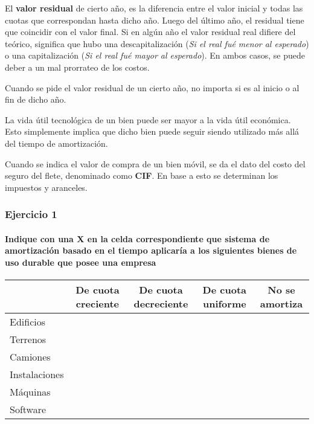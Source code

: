 \documentclass[12pt,a4paper]{article}
\newcommand{\consigna}[1]{\paragraph{\indent #1} \hspace{0pt}}
\begin{document}
{            El \textbf{valor residual} de cierto año, es la diferencia entre el valor inicial y todas las cuotas que correspondan hasta dicho año.
            Luego del último año, el residual tiene que coincidir con el valor final.
            Si en algún año el valor residual real difiere del teórico, significa que hubo una descapitalización (\textsl{Si el real fué menor al esperado}) o una capitalización (\textsl{Si el real fué mayor al esperado}).
            En ambos casos, se puede deber a un mal prorrateo de los costos.
            
            Cuando se pide el valor residual de un cierto año, no importa si es al inicio o al fin de dicho año.
            
            La vida útil tecnológica de un bien puede ser mayor a la vida útil económica.
            Esto simplemente implica que dicho bien puede seguir siendo utilizado más allá del tiempo de amortización.
            
            Cuando se indica el valor de compra de un bien móvil, se da el dato del costo del seguro del flete,  denominado como \textbf{CIF}.
            En base a esto se determinan los impuestos y aranceles.
        	}
        
        
        \hrulefill
        
        \subsubsection{Ejercicio 1}
        
        \consigna{Indique con una X en la celda correspondiente que sistema de amortización basado en el tiempo aplicaría a los siguientes bienes de uso durable que posee una empresa}
        
        \begin{table}[H]
        \centering
        	\begin{tabular}{ | l | c | c | c | c | }
           	\hline
            & De cuota creciente	&	De cuota decreciente	& De cuota uniforme	& No se amortiza	\\ \hline
            Edificios		& & & & \\ \hline
            Terrenos		& & & & \\ \hline
            Camiones		& & & & \\ \hline
            Instalaciones	& & & & \\ \hline
            Máquinas		& & & & \\ \hline
            Software		& & & & \\ \hline
			\end{tabular}
		\end{table}
        
\end{document}
